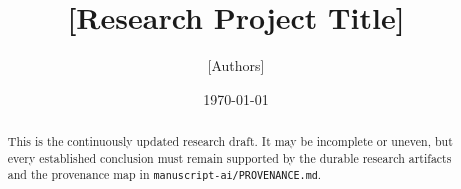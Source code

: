 \documentclass[11pt]{article}
\title{[Research Project Title]}
\author{[Authors]}
\date{\today}
\theoremstyle{definition}
\theoremstyle{remark}
\begin{document}
\maketitle

\begin{abstract}
This is the continuously updated research draft. It may be incomplete or
uneven, but every established conclusion must remain supported by the durable
research artifacts and the provenance map in
\texttt{manuscript-ai/PROVENANCE.md}.
\end{abstract}











\appendix

\end{document}
